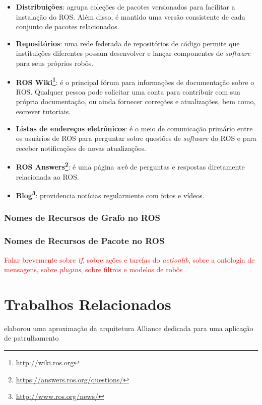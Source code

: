                 \begin{itemize}
                    \item \textbf{Distribuições}: agrupa coleções de pacotes versionados para facilitar a instalação do ROS. Além disso, é mantido uma versão consistente de cada conjunto de pacotes relacionados.
                    \item \textbf{Repositórios}: uma rede federada de repositórios de código permite que instituições diferentes possam desenvolver e lançar componentes de \textit{software} para seus próprios robôs.
                    \item \textbf{ROS Wiki\footnote{\url{http://wiki.ros.org}}}: é o principal fórum para informações de documentação sobre o ROS. Qualquer pessoa pode solicitar uma conta para contribuir com sua própria documentação, ou ainda fornecer correções e atualizações, bem como, escrever tutoriais.
                    \item \textbf{Listas de endereços eletrônicos}: é o meio de comunicação primário entre os usuários de ROS para perguntar sobre questões de \textit{software} do ROS e para receber notificações de novas atualizações.
                    \item \textbf{ROS Answers\footnote{\url{https://answers.ros.org/questions/}}}: é uma página \textit{web} de perguntas e respostas diretamente relacionada ao ROS.
                    \item \textbf{Blog\footnote{\url{http://www.ros.org/news/}}}: providencia notícias regularmente com fotos e vídeos.
                \end{itemize}
            
            \subsubsection{Nomes de Recursos de Grafo no ROS}
            
            \subsubsection{Nomes de Recursos de Pacote no ROS}
    
        \textcolor{red}{Falar brevemente sobre \textit{tf}, sobre ações e tarefas do \textit{actionlib}, sobre a ontologia de mensagens, sobre \textit{plugins}, sobre filtros e modelos de robôs}
        
    \section{Trabalhos Relacionados}
        
        
         elaborou uma aproximação da arquitetura Alliance dedicada para uma aplicação de patrulhamento